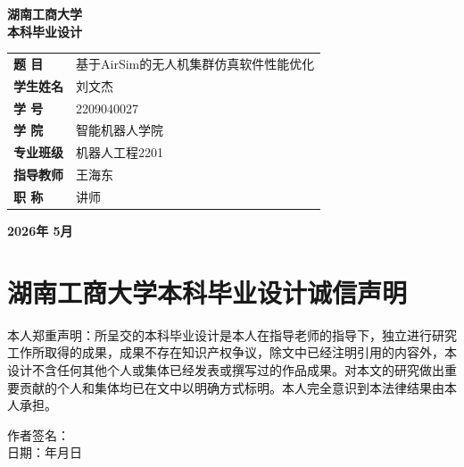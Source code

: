 \begin{titlepage}
    \centering
    \vspace*{2cm}
    
    {\Huge\bfseries 湖南工商大学\\[0.5cm]
    本科毕业设计\\[2cm]}
    
    \begin{center}
        \begin{tabular}{p{3cm}p{8cm}}
            \textbf{题 目} & 基于AirSim的无人机集群仿真软件性能优化 \\
            \textbf{学生姓名} & 刘文杰 \\
            \textbf{学 号} & 2209040027 \\
            \textbf{学 院} & 智能机器人学院 \\
            \textbf{专业班级} & 机器人工程2201 \\
            \textbf{指导教师} & 王海东 \\
            \textbf{职 称} & 讲师 \\
        \end{tabular}
    \end{center}
    
    \vspace{2cm}
    {\large \textbf{2026年 5月}}
    
    \newpage
    \section*{湖南工商大学本科毕业设计诚信声明}
    
    本人郑重声明：所呈交的本科毕业设计是本人在指导老师的指导下，独立进行研究工作所取得的成果，成果不存在知识产权争议，除文中已经注明引用的内容外，本设计不含任何其他个人或集体已经发表或撰写过的作品成果。对本文的研究做出重要贡献的个人和集体均已在文中以明确方式标明。本人完全意识到本法律结果由本人承担。
    
    \vspace{2cm}
    \begin{flushright}
        作者签名：\underline{\hspace{3cm}}\\
        日期：\underline{\hspace{2cm}}年\underline{\hspace{1cm}}月\underline{\hspace{1cm}}日
    \end{flushright}
    
    \newpage

\end{titlepage}
